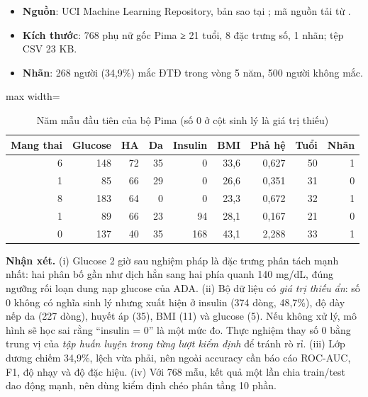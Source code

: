 \begin{itemize}
  \item \textbf{Nguồn}: UCI Machine Learning Repository, bản sao tại ; mã nguồn tải từ .
  \item \textbf{Kích thước}: 768 phụ nữ gốc Pima ≥ 21 tuổi, 8 đặc trưng số, 1 nhãn; tệp CSV 23 KB.
  \item \textbf{Nhãn}: 268 người (34,9\%) mắc ĐTĐ trong vòng 5 năm, 500 người không mắc.
\end{itemize}

\begin{table}[H]
\centering
\caption{Năm mẫu đầu tiên của bộ Pima (số 0 ở cột sinh lý là giá trị thiếu)}
\label{tab:pima-head}
\small
\begin{adjustbox}{max width=\linewidth}
\begin{tabular}{@{}rrrrrrrrr@{}}
\toprule
\textbf{Mang thai} & \textbf{Glucose} & \textbf{HA} & \textbf{Da} & \textbf{Insulin} & \textbf{BMI} & \textbf{Phả hệ} & \textbf{Tuổi} & \textbf{Nhãn} \\
\midrule
6 & 148 & 72 & 35 & 0 & 33,6 & 0,627 & 50 & 1 \\
1 & 85 & 66 & 29 & 0 & 26,6 & 0,351 & 31 & 0 \\
8 & 183 & 64 & 0 & 0 & 23,3 & 0,672 & 32 & 1 \\
1 & 89 & 66 & 23 & 94 & 28,1 & 0,167 & 21 & 0 \\
0 & 137 & 40 & 35 & 168 & 43,1 & 2,288 & 33 & 1 \\
\bottomrule
\end{tabular}
\end{adjustbox}
\end{table}


\textbf{Nhận xét.} (i) Glucose 2 giờ sau nghiệm pháp là đặc trưng phân tách mạnh nhất: hai phân bố gần như dịch hẳn sang hai phía quanh 140 mg/dL, đúng ngưỡng rối loạn dung nạp glucose của ADA. (ii) Bộ dữ liệu có \emph{giá trị thiếu ẩn}: số 0 không có nghĩa sinh lý nhưng xuất hiện ở insulin (374 dòng, 48,7\%), độ dày nếp da (227 dòng), huyết áp (35), BMI (11) và glucose (5). Nếu không xử lý, mô hình sẽ học sai rằng ``insulin = 0'' là một mức đo. Thực nghiệm thay số 0 bằng trung vị của \emph{tập huấn luyện trong từng lượt kiểm định} để tránh rò rỉ. (iii) Lớp dương chiếm 34,9\%, lệch vừa phải, nên ngoài accuracy cần báo cáo ROC-AUC, F1, độ nhạy và độ đặc hiệu. (iv) Với 768 mẫu, kết quả một lần chia train/test dao động mạnh, nên dùng kiểm định chéo phân tầng 10 phần.

